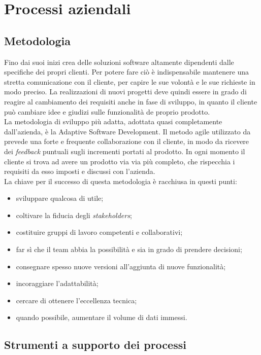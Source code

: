\section{Processi aziendali}
\subsection{Metodologia}
Fino dai suoi inizi \azienda{} crea delle soluzioni software altamente dipendenti dalle specifiche dei propri clienti. Per potere fare ciò è indispensabile mantenere una stretta comunicazione con il cliente, per capire le sue volontà e le sue richieste in modo preciso. La realizzazioni di nuovi progetti deve quindi essere in grado di reagire al cambiamento dei requisiti anche in fase di sviluppo, in quanto il cliente può cambiare idee e giudizi sulle funzionalità de proprio prodotto.\\
La metodologia di sviluppo più adatta, adottata quasi completamente dall'azienda, è la Adaptive Software Development.
Il metodo agile utilizzato da \azienda{} prevede una forte e frequente collaborazione con il cliente, in modo da ricevere dei \emph{feedback} puntuali sugli incrementi portati al prodotto. In ogni momento il cliente si trova ad avere un prodotto via via più completo, che rispecchia i requisiti da esso imposti e discussi con l'azienda.\\
La chiave per il successo di questa metodologia è racchiusa in questi punti:
\begin{itemize}
	\item sviluppare qualcosa di utile;
	\item coltivare la fiducia degli \emph{stakeholders};
	\item costituire gruppi di lavoro competenti e collaborativi;
	\item far sì che il team abbia la possibilità e sia in grado di prendere decisioni;
	\item consegnare spesso nuove versioni all'aggiunta di nuove funzionalità;
	\item incoraggiare l'adattabilità;
	\item cercare di ottenere l'eccellenza tecnica;
	\item quando possibile, aumentare il volume di dati immessi.
\end{itemize}

\subsection{Strumenti a supporto dei processi}
